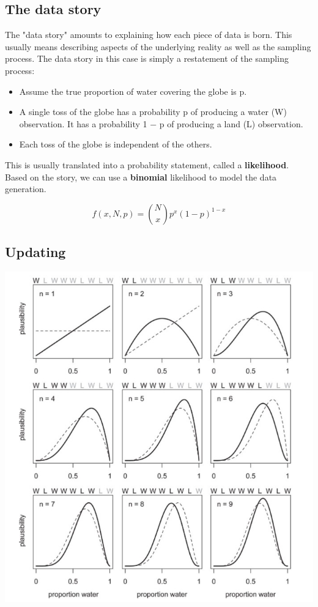 \documentclass[11pt]{article}
\begin{document}
\subsection*{The data story}
\label{sec-1-1}
The "data story" amounts to explaining how each piece of data is born. This usually means describing aspects of the underlying reality as well as the sampling process. The data story in this case is simply a restatement of the sampling process:
\begin{itemize}
\item Assume the true proportion of water covering the globe is p.
\item A single toss of the globe has a probability p of producing a water (W) observation. It has a probability 1 − p of producing a land (L) observation.
\item Each toss of the globe is independent of the others.
\end{itemize}

This is usually translated into a probability statement, called a \textbf{likelihood}.  Based on the story, we can use a \textbf{binomial} likelihood to model the data generation.

\[
f(x,N,p) = \binom{N}{x}p^{x}(1-p)^{1-x}
\]

\subsection*{Updating}
\label{sec-1-2}

\includegraphics[width=.9\linewidth]{figures/week9/globeTossing.jpg}
\end{document}
